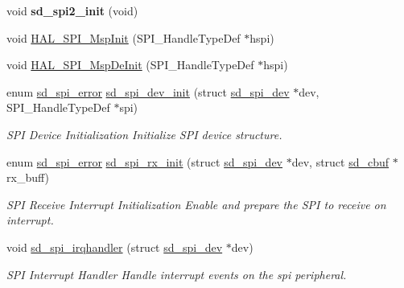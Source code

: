 \begin{DoxyCompactItemize}
\item 
\mbox{\label{group___s_d___s_p_i___functions_ga8118d57f7a1dacd85c82cf695fe595a0}} 
void {\bfseries sd\+\_\+spi2\+\_\+init} (void)
\item 
void \mbox{\hyperlink{group___s_d___s_p_i___functions_ga17f583be14b22caffa6c4e56dcd035ef}{H\+A\+L\+\_\+\+S\+P\+I\+\_\+\+Msp\+Init}} (S\+P\+I\+\_\+\+Handle\+Type\+Def $\ast$hspi)
\item 
void \mbox{\hyperlink{group___s_d___s_p_i___functions_gabadc4d4974af1afd943e8d13589068e1}{H\+A\+L\+\_\+\+S\+P\+I\+\_\+\+Msp\+De\+Init}} (S\+P\+I\+\_\+\+Handle\+Type\+Def $\ast$hspi)
\item 
enum \mbox{\hyperlink{group___s_d___s_p_i___types_ga9ae67f7089a8196e9c6b74b8a6708c2e}{sd\+\_\+spi\+\_\+error}} \mbox{\hyperlink{group___s_d___s_p_i___functions_gaf4898042003aea6ba58eb519eb115284}{sd\+\_\+spi\+\_\+dev\+\_\+init}} (struct \mbox{\hyperlink{structsd__spi__dev}{sd\+\_\+spi\+\_\+dev}} $\ast$dev, S\+P\+I\+\_\+\+Handle\+Type\+Def $\ast$spi)
\begin{DoxyCompactList}\small\item\em S\+PI Device Initialization Initialize S\+PI device structure. \end{DoxyCompactList}\item 
enum \mbox{\hyperlink{group___s_d___s_p_i___types_ga9ae67f7089a8196e9c6b74b8a6708c2e}{sd\+\_\+spi\+\_\+error}} \mbox{\hyperlink{group___s_d___s_p_i___functions_gad3e4aa819e8e76a92816be83ca2702c9}{sd\+\_\+spi\+\_\+rx\+\_\+init}} (struct \mbox{\hyperlink{structsd__spi__dev}{sd\+\_\+spi\+\_\+dev}} $\ast$dev, struct \mbox{\hyperlink{structsd__cbuf}{sd\+\_\+cbuf}} $\ast$rx\+\_\+buff)
\begin{DoxyCompactList}\small\item\em S\+PI Receive Interrupt Initialization Enable and prepare the S\+PI to receive on interrupt. \end{DoxyCompactList}\item 
void \mbox{\hyperlink{group___s_d___s_p_i___functions_ga091c2e241f814bec60a92c7f97eb89ae}{sd\+\_\+spi\+\_\+irqhandler}} (struct \mbox{\hyperlink{structsd__spi__dev}{sd\+\_\+spi\+\_\+dev}} $\ast$dev)
\begin{DoxyCompactList}\small\item\em S\+PI Interrupt Handler Handle interrupt events on the spi peripheral. \end{DoxyCompactList}\item 

\end{DoxyCompactItemize}
